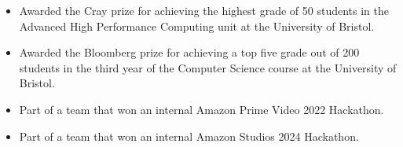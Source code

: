 \vspace{-1.1em}


\begin{cvparagraph}

\begin{itemize}[leftmargin=*]
    \itemsep-0.6em
    \item {Awarded the Cray prize for achieving the highest grade of 50 students in the Advanced High Performance Computing unit at the University of Bristol.}
    \item {Awarded the Bloomberg prize for achieving a top five grade out of 200 students in the third year of the Computer Science course at the University of Bristol.}
    \item {Part of a team that won an internal Amazon Prime Video 2022 Hackathon.}
    \item {Part of a team that won an internal Amazon Studios 2024 Hackathon.}
\end{itemize}

\end{cvparagraph}